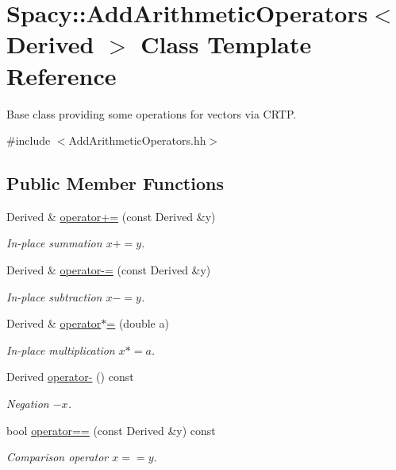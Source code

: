 \hypertarget{classSpacy_1_1AddArithmeticOperators}{\section{Spacy\-:\-:Add\-Arithmetic\-Operators$<$ Derived $>$ Class Template Reference}
\label{classSpacy_1_1AddArithmeticOperators}
}


Base class providing some operations for vectors via C\-R\-T\-P.  




{\ttfamily \#include $<$Add\-Arithmetic\-Operators.\-hh$>$}

\subsection*{Public Member Functions}
\begin{DoxyCompactItemize}
\item 
Derived \& \hyperlink{classSpacy_1_1AddArithmeticOperators_afad1d01e1e8c6f75290ac46d9b047ea8}{operator+=} (const Derived \&y)
\begin{DoxyCompactList}\small\item\em In-\/place summation $ x+=y$. \end{DoxyCompactList}\item 
Derived \& \hyperlink{classSpacy_1_1AddArithmeticOperators_a9fa91e177d13203cfe8cfa991c64ca36}{operator-\/=} (const Derived \&y)
\begin{DoxyCompactList}\small\item\em In-\/place subtraction $ x-=y$. \end{DoxyCompactList}\item 
Derived \& \hyperlink{classSpacy_1_1AddArithmeticOperators_a1d3db95b24fd2bc1de712c9e04c47e2f}{operator$\ast$=} (double a)
\begin{DoxyCompactList}\small\item\em In-\/place multiplication $ x*=a$. \end{DoxyCompactList}\item 
Derived \hyperlink{classSpacy_1_1AddArithmeticOperators_a5acd030bf265d130983fd6e3c5b68be5}{operator-\/} () const 
\begin{DoxyCompactList}\small\item\em Negation $ -x$. \end{DoxyCompactList}\item 
bool \hyperlink{classSpacy_1_1AddArithmeticOperators_a5ff1909f49f4a705d69663dc2d4b6316}{operator==} (const Derived \&y) const 
\begin{DoxyCompactList}\small\item\em Comparison operator $ x==y$. \end{DoxyCompactList}\end{DoxyCompactItemize}


